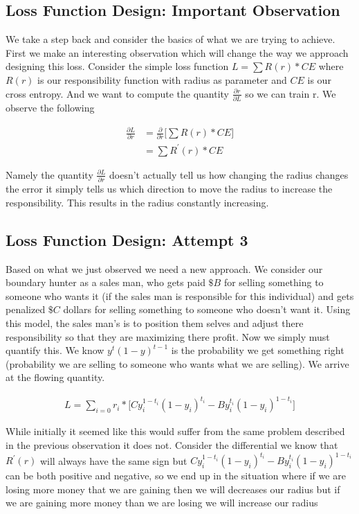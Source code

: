 \documentclass{article}
\theoremstyle{definition}
\begin{document}
\subsection{Loss Function Design: Important Observation}
We take a step back and consider the basics of what we are trying to achieve. First we make an interesting observation which will change the way we approach designing this loss. Consider the simple loss function $L =\sum R(r) * CE$ where $R(r)$ is our responsibility function with radius as parameter and $CE$ is our cross entropy. And we want to compute the quantity $\frac{\partial r}{\partial L}$ so we can train r. We observe the following

\begin{align*}
\frac{\partial L}{\partial r} &= \frac{\partial}{\partial r} \big[ \sum R(r) * CE \big] \\
&= \sum R^{'} (r) * CE
\end{align*} 

Namely the quantity $\frac{\partial L}{\partial r}$ doesn't actually tell us how changing the radius changes the error it simply tells us which direction to move the radius to increase the responsibility. This results in the radius constantly increasing.\\

\subsection{Loss Function Design: Attempt 3}
Based on what we just observed we need a new approach. We consider our boundary hunter as a sales man, who gets paid $\$B$ for selling something to someone who wants it (if the sales man is responsible for this individual) and gets penalized $\$C$ dollars for selling something to someone who doesn't want it. Using this model, the sales man's is to position them selves and adjust there responsibility so that they are maximizing there profit. Now we simply must quantify this. We know $y^t(1-y)^{t-1}$ is the probability we get something right (probability we are selling to someone who wants what we are selling). We arrive at the flowing quantity.

\begin{align}
L = \sum_{i=0} r_i * \big[Cy_i^{1-t_i}(1-y_i)^{t_i} - By_i^{t_i}(1-y_i)^{1-t_i} \big] 
\end{align}

While initially it seemed like this would suffer from the same problem described in the previous observation it does not. Consider the differential we know that $R^{'}(r)$ will always have the same sign but $Cy_i^{1-t_i}(1-y_i)^{t_i} - By_i^{t_i}(1-y_i)^{1-t_i} $ can be both positive and negative, so we end up in the situation where if we are losing more money that we are gaining then we will decreases our radius but if we are gaining more money than we are losing we will increase our radius
\end{document}

